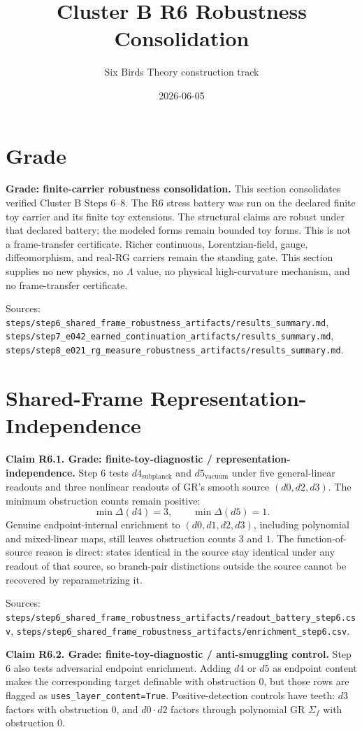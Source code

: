 \documentclass[11pt]{article}
\title{Cluster B R6 Robustness Consolidation}
\author{Six Birds Theory construction track}
\date{2026-06-05}
\begin{document}
\maketitle

\section{Grade}

\textbf{Grade: finite-carrier robustness consolidation.}
This section consolidates verified Cluster B Steps 6--8. The R6 stress battery was run on the declared finite toy carrier and its finite toy extensions. The structural claims are robust under that declared battery; the modeled forms remain bounded toy forms. This is not a frame-transfer certificate. Richer continuous, Lorentzian-field, gauge, diffeomorphism, and real-RG carriers remain the standing gate. This section supplies no new physics, no \(\Lambda\) value, no physical high-curvature mechanism, and no frame-transfer certificate.

Sources: \texttt{steps/step6\_shared\_frame\_robustness\_artifacts/results\_summary.md}, \texttt{steps/step7\_e042\_earned\_continuation\_artifacts/results\_summary.md}, \texttt{steps/step8\_e021\_rg\_measure\_robustness\_artifacts/results\_summary.md}.

\section{Shared-Frame Representation-Independence}

\textbf{Claim R6.1. Grade: finite-toy-diagnostic / representation-independence.}
Step 6 tests \(d4_{\mathrm{subplanck}}\) and \(d5_{\mathrm{vacuum}}\) under five general-linear readouts and three nonlinear readouts of GR's smooth source \((d0,d2,d3)\). The minimum obstruction counts remain positive:
\[
\min \Delta(d4)=3,\qquad \min \Delta(d5)=1.
\]
Genuine endpoint-internal enrichment to \((d0,d1,d2,d3)\), including polynomial and mixed-linear maps, still leaves obstruction counts \(3\) and \(1\). The function-of-source reason is direct: states identical in the source stay identical under any readout of that source, so branch-pair distinctions outside the source cannot be recovered by reparametrizing it.

Sources: \texttt{steps/step6\_shared\_frame\_robustness\_artifacts/readout\_battery\_step6.csv}, \texttt{steps/step6\_shared\_frame\_robustness\_artifacts/enrichment\_step6.csv}.

\textbf{Claim R6.2. Grade: finite-toy-diagnostic / anti-smuggling control.}
Step 6 also tests adversarial endpoint enrichment. Adding \(d4\) or \(d5\) as endpoint content makes the corresponding target definable with obstruction \(0\), but those rows are flagged as \texttt{uses\_layer\_content=True}. Positive-detection controls have teeth: \(d3\) factors with obstruction \(0\), and \(d0\cdot d2\) factors through polynomial GR \(\Sigma_f\) with obstruction \(0\).
\end{document}
